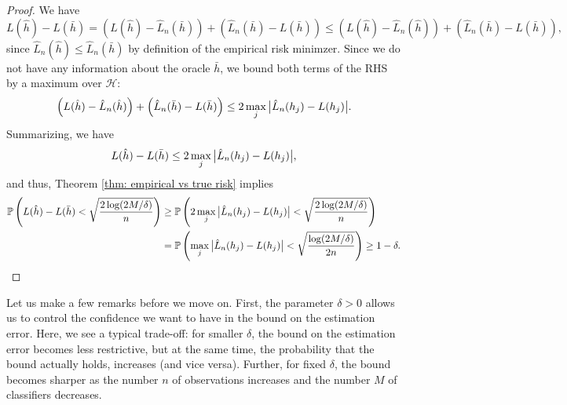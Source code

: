 \begin{proof}
We have
\[
    L(\hat h) - L(\bar h) = \left(L(\hat h) - \hat L_n(\bar h)\right) + \left(\hat L_n(\bar h) - L(\bar h)\right) \leq \left(L(\hat h) - \hat L_n(\hat h)\right) + \left(\hat L_n(\bar h) - L(\bar h)\right),
\]
since $\hat L_n(\hat h) \leq \hat L_n(\bar h)$ by definition of the empirical risk minimzer. Since we do not have any information about the oracle $\bar h$, we bound both terms of the RHS by a maximum over $\mathcal{H}$:
\[
    \left(L(\hat h) - \hat L_n(\hat h)\right) + \left(\hat L_n(\bar h) - L(\bar h)\right) \leq 2 \max_{j} \big\lvert \hat L_n(h_j) - L(h_j) \big\rvert.
\]
Summarizing, we have
\[
    L(\hat h) - L(\bar h) \leq 2 \max_j \big\lvert \hat L_n(h_j) - L(h_j) \big\rvert,
\]
and thus, Theorem \ref{thm: empirical vs true risk} implies
\begin{align*}
    \mathbb{P}\left(L(\hat h) - L(\bar h) < \sqrt{\frac{2\log(2M/\delta)}{n}}\right) &\geq \mathbb{P}\left(2 \max_j \big\lvert \hat L_n(h_j) - L(h_j) \big\rvert < \sqrt{\frac{2\log(2M/\delta)}{n}}\right) \\
        &= \mathbb{P}\left(\max_j \big\lvert \hat L_n(h_j) - L(h_j) \big\rvert < \sqrt{\frac{\log(2M/\delta)}{2n}}\right) \geq 1 - \delta.
\end{align*}
\end{proof}

Let us make a few remarks before we move on. First, the parameter $\delta > 0$ allows us to control the confidence we want to have in the bound on the estimation error. Here, we see a typical trade-off: for smaller $\delta$, the bound on the estimation error becomes less restrictive, but at the same time, the probability that the bound actually holds, increases (and vice versa). Further, for fixed $\delta$, the bound becomes sharper as the number $n$ of observations increases and the number $M$ of classifiers decreases.
